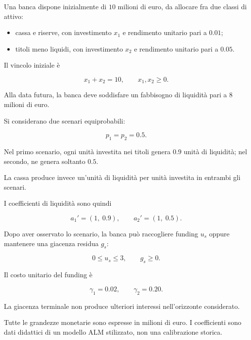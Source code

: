 \begin{exercise}

\label{ex:cap15-sp-ws-ev}

Una banca dispone inizialmente
di $10$ milioni di euro, da allocare
fra due classi di attivo:

\begin{itemize}

\item cassa e riserve, con investimento $x_1$
e rendimento unitario pari a $0.01$;

\item titoli meno liquidi, con investimento $x_2$
e rendimento unitario pari a $0.05$.

\end{itemize}

Il vincolo iniziale \`e

\[
x_1+x_2=10,
\qquad
x_1,x_2\geq0.
\]

Alla data futura, la banca deve soddisfare
un fabbisogno di liquidit\`a
pari a $8$ milioni di euro.

Si considerano due scenari equiprobabili:

\[
p_1=p_2=0.5.
\]

Nel primo scenario, ogni unit\`a
investita nei titoli genera $0.9$
unit\`a di liquidit\`a;
nel secondo, ne genera soltanto $0.5$.

La cassa produce invece un'unit\`a
di liquidit\`a per unit\`a investita
in entrambi gli scenari.

I coefficienti di liquidit\`a sono quindi

\[
a_1'=(1,\;0.9),
\qquad
a_2'=(1,\;0.5).
\]

Dopo aver osservato lo scenario,
la banca pu\`o raccogliere funding $u_s$
oppure mantenere una giacenza residua $g_s$:

\[
0\leq u_s\leq3,
\qquad
g_s\geq0.
\]

Il costo unitario del funding \`e

\[
\gamma_1=0.02,
\qquad
\gamma_2=0.20.
\]

La giacenza terminale non produce
ulteriori interessi nell'orizzonte
considerato.

Tutte le grandezze monetarie
sono espresse in milioni di euro.
I coefficienti sono dati didattici
di un modello ALM stilizzato,
non una calibrazione storica.

\begin{enumerate}


\end{enumerate}
\end{exercise}
